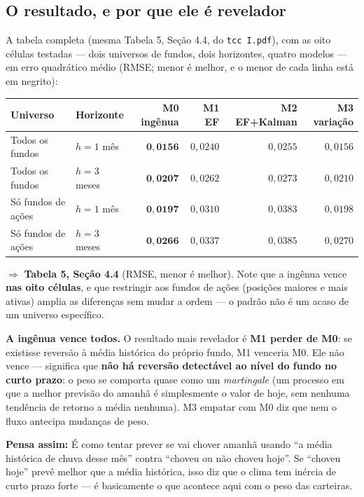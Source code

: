 \documentclass[11pt,a4paper]{article}
\newcommand{\analogia}[1]{\par\vspace{4pt}\noindent\textbf{\color{verde}Pensa assim:} #1\par\vspace{2pt}}
\begin{document}
\subsection{O resultado, e por que ele é revelador}

A tabela completa (mesma Tabela 5, Seção 4.4, do \texttt{tcc I.pdf}), com as oito células
testadas --- dois universos de fundos, dois horizontes, quatro modelos --- em erro quadrático
médio (RMSE; menor é melhor, e o menor de cada linha está em negrito):

\begin{center}\small
\begin{tabular}{@{}llrrrr@{}}
\toprule
Universo & Horizonte & M0 ingênua & M1 EF & M2 EF+Kalman & M3 variação \\
\midrule
Todos os fundos    & $h=1$ mês & $\mathbf{0{,}0156}$ & $0{,}0240$ & $0{,}0255$ & $0{,}0156$ \\
Todos os fundos    & $h=3$ meses & $\mathbf{0{,}0207}$ & $0{,}0262$ & $0{,}0273$ & $0{,}0210$ \\
Só fundos de ações & $h=1$ mês & $\mathbf{0{,}0197}$ & $0{,}0310$ & $0{,}0383$ & $0{,}0198$ \\
Só fundos de ações & $h=3$ meses & $\mathbf{0{,}0266}$ & $0{,}0337$ & $0{,}0385$ & $0{,}0270$ \\
\bottomrule
\end{tabular}
\end{center}
$\Rightarrow$ \textbf{Tabela 5, Seção 4.4} (RMSE, menor é melhor). Note que a ingênua vence
\textbf{nas oito células}, e que restringir aos fundos de ações (posições maiores e mais ativas)
amplia as diferenças sem mudar a ordem --- o padrão não é um acaso de um universo específico.

\textbf{A ingênua vence todos.} O resultado mais revelador é \textbf{M1 perder de M0}: se
existisse reversão à média histórica do próprio fundo, M1 venceria M0. Ele não vence ---
significa que \textbf{não há reversão detectável ao nível do fundo no curto prazo}: o peso se
comporta quase como um \emph{martingale} (um processo em que a melhor previsão do amanhã é
simplesmente o valor de hoje, sem nenhuma tendência de retorno a média nenhuma). M3 empatar com
M0 diz que nem o fluxo antecipa mudanças de peso.

\analogia{É como tentar prever se vai chover amanhã usando ``a média histórica de chuva desse
mês'' contra ``choveu ou não choveu hoje''. Se ``choveu hoje'' prevê melhor que a média
histórica, isso diz que o clima tem inércia de curto prazo forte --- é basicamente o que
acontece aqui com o peso das carteiras.}
\end{document}
